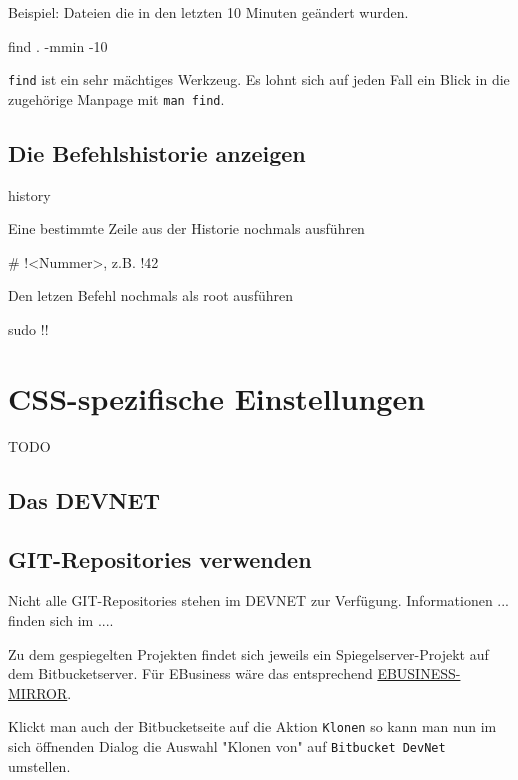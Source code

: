 \documentclass[]{article}
\newcommand{\code}[1]{\texttt{#1}}
\begin{document}
Beispiel: Dateien die in den letzten 10 Minuten geändert wurden.
\begin{bashcode}
find . -mmin -10
\end{bashcode}

\code{find} ist ein sehr mächtiges Werkzeug. Es lohnt sich auf jeden Fall ein Blick in die zugehörige Manpage mit \code{man find}.

\subsection{Die Befehlshistorie anzeigen}
\begin{bashcode}
history
\end{bashcode}

Eine bestimmte Zeile aus der Historie nochmals ausführen
\begin{bashcode}
# !<Nummer>, z.B.
!42
\end{bashcode}


Den letzen Befehl nochmals als root ausführen
\begin{bashcode}
sudo !!
\end{bashcode}

\section{CSS-spezifische Einstellungen}
TODO
\subsection{Das DEVNET}
\subsection{GIT-Repositories verwenden}
Nicht alle GIT-Repositories stehen im DEVNET zur Verfügung. Informationen ... finden sich im ....

Zu dem gespiegelten Projekten findet sich jeweils ein Spiegelserver-Projekt auf dem Bitbucketserver. 
Für EBusiness wäre das entsprechend \href{https://git.css.ch/projects/EBUSINESS-MIRROR}{EBUSINESS-MIRROR}.

Klickt man auch der Bitbucketseite auf die Aktion \code{Klonen} so kann man nun im sich öffnenden Dialog die Auswahl "Klonen von" auf \code{Bitbucket DevNet} umstellen.
\end{document}
